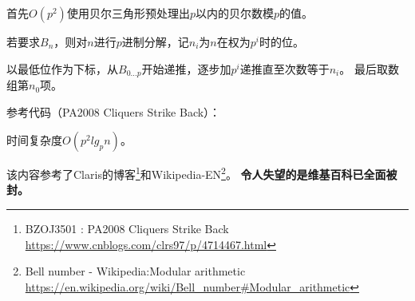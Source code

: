首先$O(p^2)$使用贝尔三角形预处理出$p$以内的贝尔数模$p$的值。

若要求$B_n$，则对$n$进行$p$进制分解，记$n_i$为$n$在权为$p^i$时的位。

以最低位作为下标，从$B_{0\ldots p}$开始递推，逐步加$p^i$递推直至次数等于$n_i$。
最后取数组第$n_0$项。

参考代码（PA2008 Cliquers Strike Back）：


时间复杂度$O(p^2lg_pn)$。

该内容参考了Claris的博客\footnote{
    BZOJ3501 : PA2008 Cliquers Strike Back
    \url{https://www.cnblogs.com/clrs97/p/4714467.html}
}和Wikipedia-EN\footnote{
    Bell number - Wikipedia:Modular arithmetic\\
    \url{https://en.wikipedia.org/wiki/Bell\_number\#Modular\_arithmetic}
}。
{\bfseries 令人失望的是维基百科已全面被封。}
